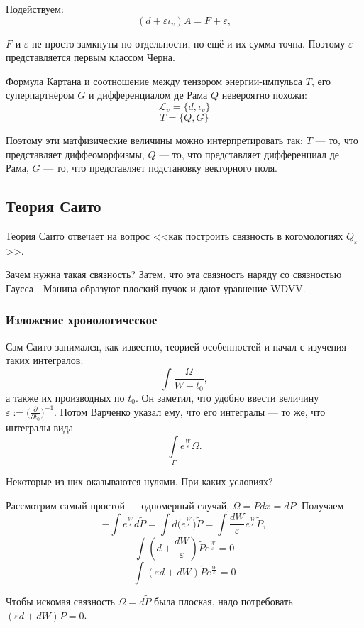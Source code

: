 \documentclass[11pt]{article}
\def\p{\partial}
\theoremstyle{remark}
\theoremstyle{definition}
\begin{document}
Подействуем: $$(d + \varepsilon \iota_v) A = F + \varepsilon,$$

$F$ и $\varepsilon$ не просто замкнуты по отдельности, но ещё и их сумма точна. Поэтому $\varepsilon$ представляется первым классом Черна.

Формула Картана и соотношение между тензором энергии-импульса $T$, его суперпартнёром $G$ и дифференциалом де Рама $Q$ невероятно похожи:
$$\mathcal{L}_v  = \{d, \iota_v\}$$
$$T = \{Q, G\}$$

Поэтому эти матфизические величины можно интерпретировать так: $T$ --- то, что представляет диффеоморфизмы, $Q$ --- то, что представляет дифференциал де Рама, $G$ --- то, что представляет подстановку векторного поля.

\subsection{Теория Саито}
Теория Саито отвечает на вопрос <<как построить связность в когомологиях $Q_{\varepsilon}$>>.

Зачем нужна такая связность? Затем, что эта связность наряду со связностью Гаусса---Манина образуют плоский пучок и дают уравнение WDVV.

\subsubsection{Изложение хронологическое}

Сам Саито занимался, как известно, теорией особенностей и начал с изучения таких интегралов: $$\int \frac{\Omega}{W - t_0},$$ а также их производных по $t_0$. Он заметил, что удобно ввести величину $\varepsilon := \Big(\frac{\p}{\p t_0} \Big)^{-1}$. Потом Варченко указал ему, что его интегралы --- то же, что интегралы вида $$\int\limits_{\Gamma} e^{\frac{W}{\varepsilon}} \Omega.$$

Некоторые из них оказываются нулями. При каких условиях?

Рассмотрим самый простой --- одномерный случай, $\Omega = P dx = d\tilde P$. Получаем $$- \int e^{\frac{W}{\varepsilon}} d\tilde P = \int d \Big( e^{\frac{W}{\varepsilon}} \Big) \tilde P = \int \frac{dW}{\varepsilon} e^{\frac{W}{\varepsilon}} \tilde P,$$ $$\int (d + \frac{dW}{\varepsilon}) \tilde P e^{\frac{W}{\varepsilon}} = 0$$ $$\int (\varepsilon d + dW) \tilde P e^{\frac{W}{\varepsilon}} = 0$$

Чтобы искомая связность $\Omega = d\tilde P$ была плоская, надо потребовать $(\varepsilon d + dW) \tilde P = 0$.
\end{document}
